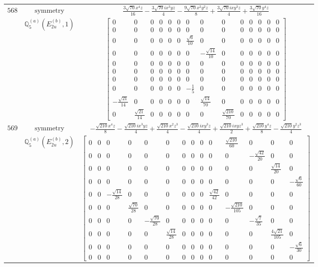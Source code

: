 \documentclass[fleqn,8pt,landscape]{jsarticle}
\begin{document}
\begin{longtable}{ccc}
$ 568 $ & $ \text{symmetry} $ & $ \frac{3 \sqrt{70} x^{4} z}{16} - \frac{3 \sqrt{70} i x^{3} y z}{4} - \frac{9 \sqrt{70} x^{2} y^{2} z}{8} + \frac{3 \sqrt{70} i x y^{3} z}{4} + \frac{3 \sqrt{70} y^{4} z}{16} $ \\
$  $ & $ \mathbb{Q}_{5}^{(a)}(E_{2u}^{(b)},1) $ & $ \begin{bmatrix} 0 & 0 & 0 & 0 & 0 & 0 & 0 & 0 & 0 & 0 & 0 & 0 & 0 & 0 \\ 0 & 0 & 0 & 0 & 0 & 0 & 0 & 0 & 0 & 0 & 0 & 0 & 0 & 0 \\ 0 & 0 & 0 & 0 & 0 & 0 & \frac{\sqrt{6}}{10} & 0 & 0 & 0 & 0 & 0 & 0 & 0 \\ 0 & 0 & 0 & 0 & 0 & 0 & 0 & - \frac{\sqrt{14}}{10} & 0 & 0 & 0 & 0 & 0 & 0 \\ 0 & 0 & 0 & 0 & 0 & 0 & 0 & 0 & 0 & 0 & 0 & 0 & 0 & 0 \\ 0 & 0 & 0 & 0 & 0 & 0 & 0 & 0 & 0 & 0 & 0 & 0 & 0 & 0 \\ 0 & 0 & 0 & 0 & 0 & 0 & 0 & 0 & 0 & 0 & 0 & 0 & 0 & 0 \\ 0 & 0 & 0 & 0 & 0 & 0 & - \frac{1}{5} & 0 & 0 & 0 & 0 & 0 & 0 & 0 \\ - \frac{\sqrt{21}}{14} & 0 & 0 & 0 & 0 & 0 & 0 & \frac{\sqrt{14}}{70} & 0 & 0 & 0 & 0 & 0 & 0 \\ 0 & \frac{\sqrt{21}}{14} & 0 & 0 & 0 & 0 & 0 & 0 & \frac{\sqrt{210}}{70} & 0 & 0 & 0 & 0 & 0 \end{bmatrix} $ \\ \hline
$ 569 $ & $ \text{symmetry} $ & $ - \frac{\sqrt{210} x^{4} z}{8} - \frac{\sqrt{210} i x^{3} y z}{4} + \frac{\sqrt{210} x^{2} z^{3}}{4} - \frac{\sqrt{210} i x y^{3} z}{4} + \frac{\sqrt{210} i x y z^{3}}{2} + \frac{\sqrt{210} y^{4} z}{8} - \frac{\sqrt{210} y^{2} z^{3}}{4} $ \\
$  $ & $ \mathbb{Q}_{5}^{(a)}(E_{2u}^{(b)},2) $ & $ \begin{bmatrix} 0 & 0 & 0 & 0 & 0 & 0 & 0 & 0 & 0 & 0 & \frac{\sqrt{210}}{60} & 0 & 0 & 0 \\ 0 & 0 & 0 & 0 & 0 & 0 & 0 & 0 & 0 & 0 & 0 & - \frac{\sqrt{42}}{20} & 0 & 0 \\ 0 & 0 & 0 & 0 & 0 & 0 & 0 & 0 & 0 & 0 & 0 & 0 & \frac{\sqrt{14}}{20} & 0 \\ 0 & 0 & 0 & 0 & 0 & 0 & 0 & 0 & 0 & 0 & 0 & 0 & 0 & - \frac{\sqrt{6}}{60} \\ 0 & 0 & - \frac{\sqrt{14}}{28} & 0 & 0 & 0 & 0 & 0 & 0 & \frac{\sqrt{42}}{42} & 0 & 0 & 0 & 0 \\ 0 & 0 & 0 & \frac{\sqrt{70}}{28} & 0 & 0 & 0 & 0 & 0 & 0 & - \frac{\sqrt{210}}{105} & 0 & 0 & 0 \\ 0 & 0 & 0 & 0 & - \frac{\sqrt{70}}{28} & 0 & 0 & 0 & 0 & 0 & 0 & - \frac{\sqrt{7}}{35} & 0 & 0 \\ 0 & 0 & 0 & 0 & 0 & \frac{\sqrt{14}}{28} & 0 & 0 & 0 & 0 & 0 & 0 & \frac{4 \sqrt{21}}{105} & 0 \\ 0 & 0 & 0 & 0 & 0 & 0 & 0 & 0 & 0 & 0 & 0 & 0 & 0 & - \frac{\sqrt{6}}{30} \\ 0 & 0 & 0 & 0 & 0 & 0 & 0 & 0 & 0 & 0 & 0 & 0 & 0 & 0 \end{bmatrix} $ \\ \hline

\end{longtable}
\end{document}
